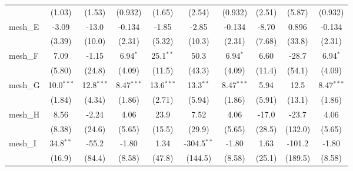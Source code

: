\begin{tabular}{lccccccccc}
                                                               & (1.03)         & (1.53)         & (0.932)       & (1.65)         & (2.54)         & (0.932)       & (2.51)         & (5.87)         & (0.932)\\   
   mesh\_E                                                     & -3.09          & -13.0          & -0.134        & -1.85          & -2.85          & -0.134        & -8.70          & 0.896          & -0.134\\   
                                                               & (3.39)         & (10.0)         & (2.31)        & (5.32)         & (10.3)         & (2.31)        & (7.68)         & (33.8)         & (2.31)\\   
   mesh\_F                                                     & 7.09           & -1.15          & 6.94$^{*}$    & 25.1$^{**}$    & 50.3           & 6.94$^{*}$    & 6.60           & -28.7          & 6.94$^{*}$\\   
                                                               & (5.80)         & (24.8)         & (4.09)        & (11.5)         & (43.3)         & (4.09)        & (11.4)         & (54.1)         & (4.09)\\   
   mesh\_G                                                     & 10.0$^{***}$   & 12.8$^{***}$   & 8.47$^{***}$  & 13.6$^{***}$   & 13.3$^{**}$    & 8.47$^{***}$  & 5.94           & 12.5           & 8.47$^{***}$\\   
                                                               & (1.84)         & (4.34)         & (1.86)        & (2.71)         & (5.94)         & (1.86)        & (5.91)         & (13.1)         & (1.86)\\   
   mesh\_H                                                     & 8.56           & -2.24          & 4.06          & 23.9           & 7.52           & 4.06          & -17.0          & -23.7          & 4.06\\   
                                                               & (8.38)         & (24.6)         & (5.65)        & (15.5)         & (29.9)         & (5.65)        & (28.5)         & (132.0)        & (5.65)\\   
   mesh\_I                                                     & 34.8$^{**}$    & -55.2          & -1.80         & 1.34           & -304.5$^{**}$  & -1.80         & 1.63           & -101.2         & -1.80\\   
                                                               & (16.9)         & (84.4)         & (8.58)        & (47.8)         & (144.5)        & (8.58)        & (25.1)         & (189.5)        & (8.58)\\   

\end{tabular}
